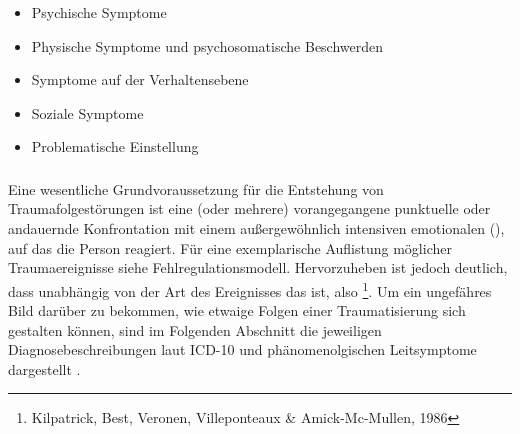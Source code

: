 {
\begin{itemize}
  \item {Psychische Symptome}
  \item {Physische Symptome und psychosomatische Beschwerden}
  \item {Symptome auf der Verhaltensebene}
  \item {Soziale Symptome}
  \item {Problematische Einstellung}
\end{itemize}
}
{}
{}
{}




\subsubsection{}


\Text{\TxBeschreibung}
{Eine wesentliche Grundvoraussetzung für die Entstehung von
Traumafolgestörungen ist eine (oder mehrere) vorangegangene
punktuelle oder andauernde Konfrontation mit einem
außergewöhnlich intensiven emotionalen
 (), auf das die Person  reagiert. 
Für eine
exemplarische Auflistung möglicher Traumaereignisse siehe
Fehlregulationsmodell. 
Hervorzuheben ist jedoch deutlich,
dass  unabhängig von der Art des Ereignisses das
 ist,
also \footnote{Kilpatrick, Best,
Veronen, Villeponteaux \& Amick-Mc-Mullen, 1986}. Um ein
ungefähres Bild darüber zu bekommen, wie etwaige Folgen einer
Traumatisierung sich gestalten können, sind im Folgenden
Abschnitt die jeweiligen Diagnosebeschreibungen laut ICD-10
und phänomenolgischen Leitsymptome dargestellt
\cite{ICD10-De-2011}.}
{}
{}
{}
{}





